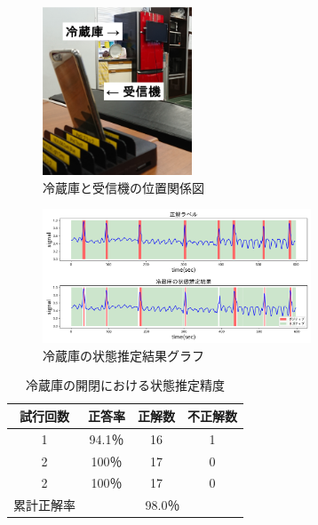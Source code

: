 \documentclass[Japanese]{dicomopapers}
\begin{document}
\begin{figure}[ht]
    \centering
    \includegraphics[height=5cm]{refrigerator_position.png}
    \caption{冷蔵庫と受信機の位置関係図}
    \label{refrigerator_position}
\end{figure}

\begin{figure}[ht]
    \centering
    \includegraphics[width=8cm]{refrigerator_graph.png}
    \caption{冷蔵庫の状態推定結果グラフ}
    \label{refrigerator_graph}
\end{figure}



\begin{table}[htb]
    \begin{center}
        \caption{冷蔵庫の開閉における状態推定精度}
        \label{refrigerator_fig}
        \begin{tabular}{|c|c|c|c|} \hline
        試行回数 & 正答率 & 正解数 & 不正解数 \\ \hline
        1 & 94.1％ & 16 & 1 \\ \hline
        2 & 100％ & 17 & 0 \\ \hline
        2 & 100％ & 17 & 0 \\ \hline \hline
        累計正解率 & \multicolumn{3}{c|}{98.0％} \\ \hline
        \end{tabular}
    \end{center}
\end{table}
\end{document}
